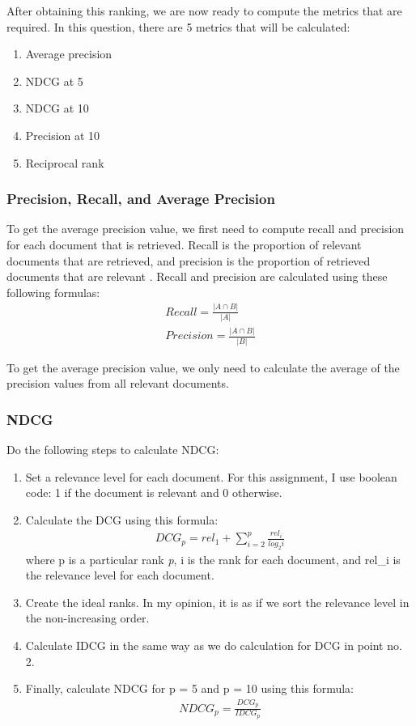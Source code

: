 \documentclass[letterpaper,11pt]{article}
\begin{document}
After obtaining this ranking, we are now ready to compute the metrics that are required. In this question, there are 5 metrics that will be calculated:
\begin{enumerate}
	\item Average precision
	\item NDCG at 5
	\item NDCG at 10
	\item Precision at 10
	\item Reciprocal rank
\end{enumerate}

\subsubsection*{Precision, Recall, and Average Precision}
To get the average precision value, we first need to compute recall and precision for each document that is retrieved. Recall is the proportion of relevant documents that are retrieved, and precision is the proportion of retrieved documents that are relevant \cite{Croft:2009:SEI:1516224}. Recall and precision are calculated using these following formulas:
\begin{align}
	Recall = \frac{\left | A \cap B \right |}{\left | A \right |}	 \\
	Precision = \frac{\left | A \cap B \right |}{\left | B \right |}
\end{align}

To get the average precision value, we only need to calculate the average of the precision values from all relevant documents. 

\subsubsection*{NDCG}
Do the following steps to calculate NDCG:
\begin{enumerate}
	\item Set a relevance level for each document. For this assignment, I use boolean code: 1 if the document is relevant and 0 otherwise. 
	\item Calculate the DCG using this formula: 
		\begin{align}
		DCG_p = rel_1 + \sum_{i=2}^p \frac{rel_i}{log_2i}
		\end{align}
		where p is a particular rank \textit{p}, i is the rank for each document, and rel\_i is the relevance level for each document. 
	\item Create the ideal ranks. In my opinion, it is as if we sort the relevance level in the non-increasing order. 
	\item Calculate IDCG in the same way as we do calculation for DCG in point no. 2. 
	\item Finally, calculate NDCG for p = 5 and p = 10 using this formula:
		\begin{align}
		NDCG_p = \frac{DCG_p}{IDCG_p}
		\end{align}
	
\end{enumerate}
\end{document}
